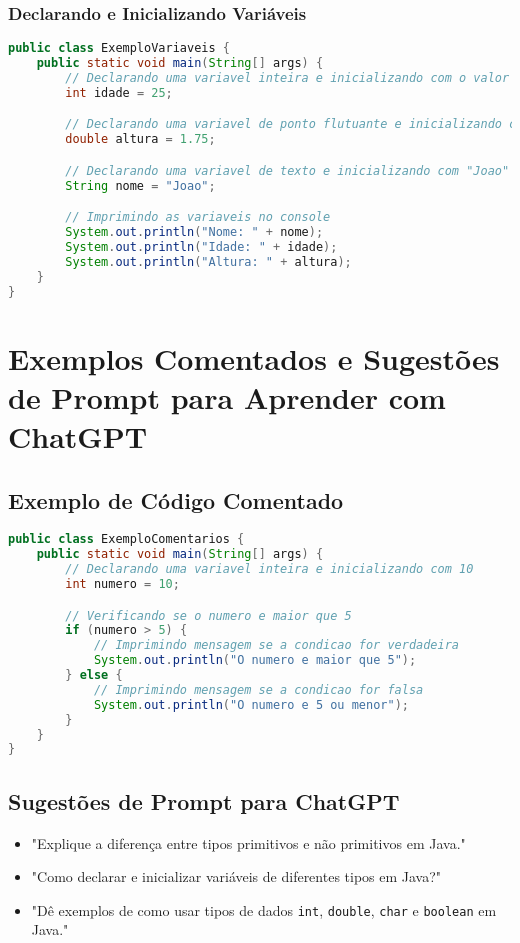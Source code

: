 \documentclass[a4paper,12pt]{book}
\begin{document}
\subsubsection{Declarando e Inicializando Variáveis}
\begin{lstlisting}[language=Java, caption=Exemplo de Declaração e Inicialização de Variáveis]
public class ExemploVariaveis {
    public static void main(String[] args) {
        // Declarando uma variavel inteira e inicializando com o valor 25
        int idade = 25;

        // Declarando uma variavel de ponto flutuante e inicializando com o valor 1.75
        double altura = 1.75;

        // Declarando uma variavel de texto e inicializando com "Joao"
        String nome = "Joao";

        // Imprimindo as variaveis no console
        System.out.println("Nome: " + nome);
        System.out.println("Idade: " + idade);
        System.out.println("Altura: " + altura);
    }
}
\end{lstlisting}

\section{Exemplos Comentados e Sugestões de Prompt para Aprender com ChatGPT}

\subsection{Exemplo de Código Comentado}
\begin{lstlisting}[language=Java, caption=Exemplo de Código Comentado]
public class ExemploComentarios {
    public static void main(String[] args) {
        // Declarando uma variavel inteira e inicializando com 10
        int numero = 10;

        // Verificando se o numero e maior que 5
        if (numero > 5) {
            // Imprimindo mensagem se a condicao for verdadeira
            System.out.println("O numero e maior que 5");
        } else {
            // Imprimindo mensagem se a condicao for falsa
            System.out.println("O numero e 5 ou menor");
        }
    }
}
\end{lstlisting}

\subsection{Sugestões de Prompt para ChatGPT}
\begin{itemize}
    \item "Explique a diferença entre tipos primitivos e não primitivos em Java."
    \item "Como declarar e inicializar variáveis de diferentes tipos em Java?"
    \item "Dê exemplos de como usar tipos de dados \texttt{int}, \texttt{double}, \texttt{char} e \texttt{boolean} em Java."
\end{itemize}
\end{document}
